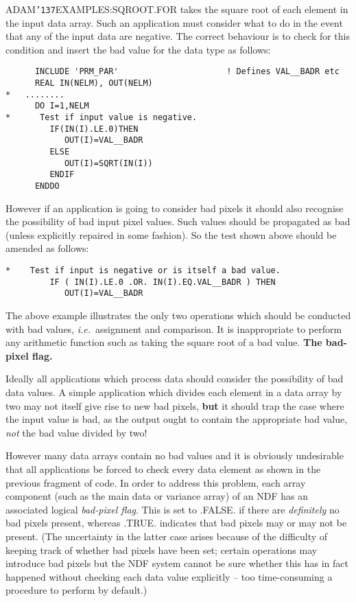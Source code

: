 \documentclass[twoside,11pt]{article}
\renewcommand{\_}{{\tt\char'137}}
\begin{document}
ADAM\_EXAMPLES:SQROOT.FOR takes the square root of each element
in the input data array.
Such an application must consider what to do in the event that any of the
input data are negative.
The correct behaviour is to check for this condition and insert the
bad value for the data type as follows:
\begin{verbatim}
      INCLUDE 'PRM_PAR'                      ! Defines VAL__BADR etc
      REAL IN(NELM), OUT(NELM)
*   ........
      DO I=1,NELM
*      Test if input value is negative.
         IF(IN(I).LE.0)THEN
            OUT(I)=VAL__BADR
         ELSE
            OUT(I)=SQRT(IN(I))
         ENDIF
      ENDDO
\end{verbatim}
However if an application is going to consider bad pixels it should also
recognise the possibility of bad input pixel values. Such values should be
propagated as bad (unless explicitly repaired in some fashion).
So the test shown above should be amended as follows:
\begin{verbatim}
*    Test if input is negative or is itself a bad value.
         IF ( IN(I).LE.0 .OR. IN(I).EQ.VAL__BADR ) THEN
            OUT(I)=VAL__BADR
\end{verbatim}
The above example illustrates the only two operations which should be conducted
with bad values, {\it i.e.}\ assignment and comparison.
It is inappropriate to perform any arithmetic function such as taking
the square root of a bad value.
\newpage
{\large\bf The bad-pixel flag.}

Ideally all applications which process data should consider the possibility of
bad data values. A simple application which divides each element in
a data array by two may not
itself give rise to new bad pixels, {\bf but} it should trap the case where the
input value is bad, as the output ought to contain the appropriate bad value,
{\sl not\/} the bad value divided by two!

However many data arrays contain no bad values and it is obviously
undesirable that all applications be forced to check every data
element as shown in  the previous fragment of code.
In order to address this problem, each array component (such as
the main data or variance array) of an NDF has an
associated logical {\sl bad-pixel flag}.
This is set to .FALSE. if there are {\sl definitely\/} no bad pixels present,
whereas .TRUE. indicates that bad pixels may or may not be present.
(The uncertainty in the latter case arises because of the difficulty
of keeping track of whether bad pixels have been set;
certain operations  may introduce bad pixels but
the NDF system cannot be sure whether this has in fact happened without checking
each data value explicitly -- too time-consuming a procedure
to perform by default.)
\end{document}
